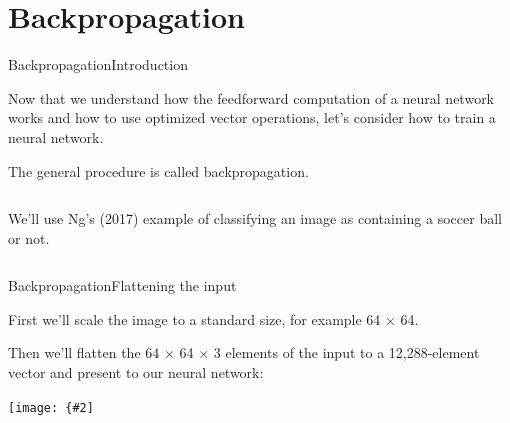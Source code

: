\documentclass{beamer}
\newcommand{\myfig}[3]{\centerline{\texttt{[image: \{\#2]}}}
\begin{document}
\section{Backpropagation}

\begin{frame}{Backpropagation}{Introduction}

  Now that we understand how the feedforward computation of a neural
  network works and how to use optimized vector operations, let's consider
  how to train a neural network.

  \medskip

  The general procedure is called \alert{backpropagation}.

  \medskip
  
  \begin{columns}

    \column{1.6in}
    

  \column{2.9in}

  We'll use Ng's (2017) example of classifying an image as containing a
  soccer ball or not.

  \end{columns}
  
\end{frame}


\begin{frame}{Backpropagation}{Flattening the input}

  First we'll scale the image to a standard size, for example 64 $\times$ 64.

  \begin{center}    
  \end{center}

  Then we'll \alert{flatten} the 64 $\times$ 64 $\times$ 3 elements
  of the input to a 12,288-element vector and present to our neural network:

  \medskip
  
  \myfig{3.5in}{soccer-flatten}{Ng (2017), CS 229 Lecture notes on deep learning}
  
\end{frame}
\end{document}
